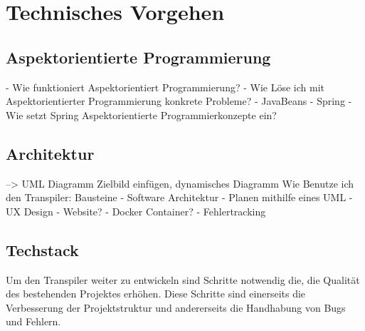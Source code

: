 \section{Technisches Vorgehen}
\subsection{Aspektorientierte Programmierung}
- Wie funktioniert Aspektorientiert Programmierung?
	- Wie Löse ich mit Aspektorientierter Programmierung konkrete Probleme?
- JavaBeans
- Spring
	- Wie setzt Spring Aspektorientierte Programmierkonzepte ein?
\subsection{Architektur} 
--> UML Diagramm Zielbild einfügen, dynamisches Diagramm
Wie Benutze ich den Transpiler:
Bausteine
- Software Architektur
	- Planen mithilfe eines UML
	- UX Design 
		- Website?
		- Docker Container?
- Fehlertracking

\subsection{Techstack}
Um den Transpiler weiter zu entwickeln sind Schritte notwendig die, die Qualität des bestehenden Projektes erhöhen. Diese Schritte sind einerseits die Verbesserung der Projektstruktur und andererseits die Handhabung von Bugs und Fehlern.

